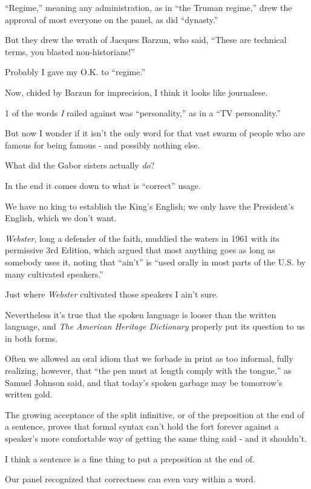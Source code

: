 \documentclass{book}
\numberwithin{equation}{section}
\begin{document}
%
``Regime,'' meaning any administration, as in ``the Truman regime,'' drew the approval of most everyone on the panel, as did ``dynasty.''

But they drew the wrath of Jacques Barzun, who said, ``These are technical terms, you blasted non-historians!''

Probably I gave my O.K. to ``regime.''

Now, chided by Barzun for imprecision, I think it looks like journalese.

1 of the words \textit{I} railed against was ``personality,'' as in a ``TV personality.''

But now I wonder if it isn't the only word for that vast swarm of people who are famous for being famous - and possibly nothing else.

What did the Gabor sisters actually \textit{do}?

%
In the end it comes down to what is ``correct'' usage.

We have no king to establish the King's English; we only have the President's English, which we don't want.

\textit{Webster}, long a defender of the faith, muddied the waters in 1961 with its permissive 3rd Edition, which argued that most anything goes as long as somebody uses it, noting that ``ain't'' is ``used orally in most parts of the U.S. by many cultivated speakers.''

%
Just where \textit{Webster} cultivated those speakers I ain't sure.

Nevertheless it's true that the spoken language is looser than the written language, and \textit{The American Heritage Dictionary} properly put its question to us in both forms.

Often we allowed an oral idiom that we forbade in print as too informal, fully realizing, however, that ``the pen must at length comply with the tongue,'' as Samuel Johnson said, and that today's spoken garbage may be tomorrow's written gold.

The growing acceptance of the split infinitive, or of the preposition at the end of a sentence, proves that formal syntax can't hold the fort forever against a speaker's more comfortable way of getting the same thing said - and it shouldn't.

I think a sentence is a fine thing to put a preposition at the end of.

%
Our panel recognized that correctness can even vary within a word.
\end{document}
